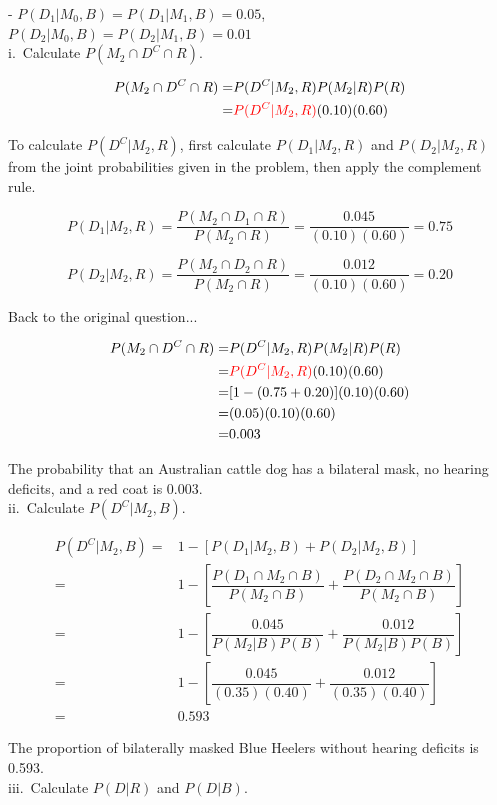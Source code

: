 {	- $P(D_1| M_0, B) = P(D_1| M_1, B) = 0.05$, $P(D_2 | M_0, B) = P(D_2 | M_1, B) = 0.01$ \\
	i.~Calculate $P(M_2 \cap D^C \cap R)$.
	
	\begin{align*}
	P(M_2 \cap D^C \cap R) =& P(D^C|M_2, R)P(M_2|R)P(R) \\
	=& \textcolor{red}{P(D^C|M_2, R)}(0.10)(0.60) \\
	\end{align*}
	
	To calculate $P(D^C|M_2, R)$, first calculate $P(D_1|M_2, R)$ and $P(D_2|M_2, R)$ from the joint probabilities given in the problem, then apply the complement rule.
	
	\[P(D_1|M_2, R) = \dfrac{P(M_2 \cap D_1 \cap R)}{P(M_2 \cap R)} = \dfrac{0.045}{(0.10)(0.60)} = 0.75\]
	
	\[P(D_2|M_2, R) = \dfrac{P(M_2 \cap D_2 \cap R)}{P(M_2 \cap R)} = \dfrac{0.012}{(0.10)(0.60)} = 0.20\]
	
	Back to the original question...
	
	\begin{align*}
	P(M_2 \cap D^C \cap R) =& P(D^C|M_2, R)P(M_2|R)P(R) \\
	=& \textcolor{red}{P(D^C|M_2, R)}(0.10)(0.60) \\
	=& [1 - (0.75 + 0.20)](0.10)(0.60) \\
	=& (0.05)(0.10)(0.60) \\
	=& 0.003
	\end{align*}
	
	The probability that an Australian cattle dog has a bilateral mask, no hearing deficits, and a red coat is 0.003. \\
	ii.~Calculate $P(D^C|M_2, B)$.
	
	\begin{align*}
	P(D^C|M_2, B) =& 1 - [P(D_1|M_2, B) + P(D_2|M_2, B)] \\
	=& 1 - \left[ \dfrac{P(D_1 \cap M_2 \cap B)}{P(M_2 \cap B)} + \dfrac{P(D_2 \cap M_2 \cap B)}{P(M_2 \cap B)} \right] \\
	=& 1 - \left[ \dfrac{0.045}{P(M_2|B)P(B)} + \dfrac{0.012}{P(M_2|B)P(B)} \right] \\
	=& 1 - \left[ \dfrac{0.045}{(0.35)(0.40)} + \dfrac{0.012}{(0.35)(0.40)} \right] \\
	=& 0.593
	\end{align*}
	
	The proportion of bilaterally masked Blue Heelers without hearing deficits is 0.593. \\
	iii.~Calculate $P(D|R)$ and $P(D|B)$.
	
}
